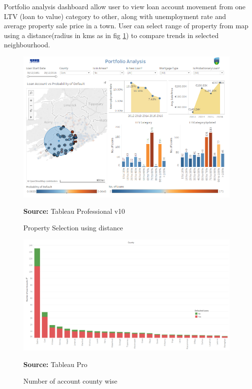 Portfolio analysis dashboard allow user to view loan account movement from one LTV (loan to value) category to other, along with unemployment rate and average property sale price in a town. User can select range of property from map using a distance(radius in kms as in fig \ref{fig:dist}) to compare trends in selected neighbourhood.

\begin{center}
\begin{figure}[!htb]
\includegraphics[width=\textwidth]{dist.png}
\centering
\caption{Property Selection using distance}{\textbf{Source:} Tableau Professional v10}
\label{fig:dist}
\end{figure}
\end{center}


\begin{center}
\begin{figure}[!htb]
\includegraphics[width=\textwidth]{countynumber.png}
\centering
\caption{Number of account county wise}{\textbf{Source:} Tableau Pro}
\label{fig:tableaucounty}
\end{figure}
\end{center}



